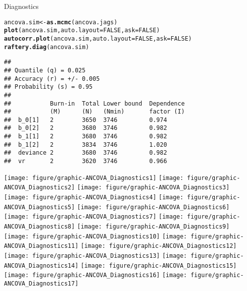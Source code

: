 \documentclass[12pt,letterpaper,oneside]{article}\usepackage{graphicx, color}
\makeatletter
\newcommand{\hlfunctioncall}[1]{\textcolor[rgb]{0.501960784313725,0,0.329411764705882}{\textbf{#1}}}%
\newenvironment{kframe}{%
 \def\at@end@of@kframe{}%
 \ifinner\ifhmode%
  \def\at@end@of@kframe{\end{minipage}}%
  \begin{minipage}{\columnwidth}%
 \fi\fi%
 \def\FrameCommand##1{\hskip\@totalleftmargin \hskip-\fboxsep
 \colorbox{shadecolor}{##1}\hskip-\fboxsep
     \hskip-\linewidth \hskip-\@totalleftmargin \hskip\columnwidth}%
 \MakeFramed {\advance\hsize-\width
   \@totalleftmargin\z@ \linewidth\hsize
   \@setminipage}}%
 {\par\unskip\endMakeFramed%
 \at@end@of@kframe}
\newenvironment{knitrout}{}{} %
\makeatother
\begin{document}
Diagnostics
\begin{knitrout}\scriptsize
{}\color{fgcolor}\begin{kframe}
\begin{alltt}
ancova.sim <- \hlfunctioncall{as.mcmc}(ancova.jags)
\hlfunctioncall{plot}(ancova.sim, auto.layout = FALSE, ask = FALSE)
\hlfunctioncall{autocorr.plot}(ancova.sim, auto.layout = FALSE, ask = FALSE)
\hlfunctioncall{raftery.diag}(ancova.sim)
\end{alltt}
\begin{verbatim}
## 
## Quantile (q) = 0.025
## Accuracy (r) = +/- 0.005
## Probability (s) = 0.95 
##                                                 
##           Burn-in  Total Lower bound  Dependence
##           (M)      (N)   (Nmin)       factor (I)
##  b_0[1]   2        3650  3746         0.974     
##  b_0[2]   2        3680  3746         0.982     
##  b_1[1]   2        3680  3746         0.982     
##  b_1[2]   2        3834  3746         1.020     
##  deviance 2        3680  3746         0.982     
##  vr       2        3620  3746         0.966
\end{verbatim}
\end{kframe}

{\centering \texttt{[image: figure/graphic-ANCOVA\_Diagnostics1]} 
\texttt{[image: figure/graphic-ANCOVA\_Diagnostics2]} 
\texttt{[image: figure/graphic-ANCOVA\_Diagnostics3]} 
\texttt{[image: figure/graphic-ANCOVA\_Diagnostics4]} 
\texttt{[image: figure/graphic-ANCOVA\_Diagnostics5]} 
\texttt{[image: figure/graphic-ANCOVA\_Diagnostics6]} 
\texttt{[image: figure/graphic-ANCOVA\_Diagnostics7]} 
\texttt{[image: figure/graphic-ANCOVA\_Diagnostics8]} 
\texttt{[image: figure/graphic-ANCOVA\_Diagnostics9]} 
\texttt{[image: figure/graphic-ANCOVA\_Diagnostics10]} 
\texttt{[image: figure/graphic-ANCOVA\_Diagnostics11]} 
\texttt{[image: figure/graphic-ANCOVA\_Diagnostics12]} 
\texttt{[image: figure/graphic-ANCOVA\_Diagnostics13]} 
\texttt{[image: figure/graphic-ANCOVA\_Diagnostics14]} 
\texttt{[image: figure/graphic-ANCOVA\_Diagnostics15]} 
\texttt{[image: figure/graphic-ANCOVA\_Diagnostics16]} 
\texttt{[image: figure/graphic-ANCOVA\_Diagnostics17]} 

}



\end{knitrout}
\end{document}
